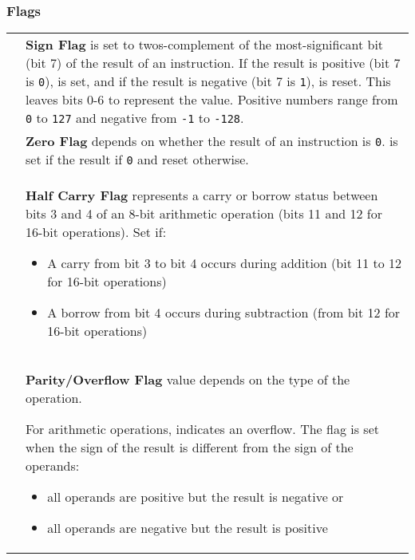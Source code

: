 \subsubsection{Flags}

\newcommand{\DetailsFlagTableList}[1]{
	\vspace*{-2ex}
	\setlist{leftmargin=1em,after=\vspace{-2ex}}
	\begin{itemize}
		\setlength\itemsep{-4pt}
		#1
	\end{itemize}
}

\newcommand{\DetailsFlagTableParagraph}{\vspace{1ex}}

{	
	\renewcommand{\arraystretch}{1.5}

	\begin{tabularx}{\linewidth}{cX}
		\FlagSF{} &
			\textbf{Sign Flag} is set to twos-complement of the most-significant bit (bit 7) of the result of an instruction. If the result is positive (bit 7 is {\tt 0}), \FlagSF{} is set, and if the result is negative (bit 7 is {\tt 1}), \FlagSF{} is reset. This leaves bits 0-6 to represent the value. Positive numbers range from {\tt 0} to {\tt 127} and negative from {\tt -1} to {\tt -128}.
			\\

		\FlagZF{} &
			\textbf{Zero Flag} depends on whether the result of an instruction is {\tt 0}. \FlagZF{} is set if the result if {\tt 0} and reset otherwise.
			\\

		\FlagHF{} &
			\textbf{Half Carry Flag} represents a carry or borrow status between bits 3 and 4 of an 8-bit arithmetic operation (bits 11 and 12 for 16-bit operations). Set if:
		
			\DetailsFlagTableList{
				\item A carry from bit 3 to bit 4 occurs during addition (bit 11 to 12 for 16-bit operations)
				\item A borrow from bit 4 occurs during subtraction (from bit 12 for 16-bit operations)
			}
			\\

		\FlagPV{} &
			\textbf{Parity/Overflow Flag} value depends on the type of the operation.
			
			\DetailsFlagTableParagraph
			For arithmetic operations, \FlagPV{} indicates an overflow. The flag is set when the sign of the result is different from the sign of the operands:
			
			\DetailsFlagTableList{
				\item all operands are positive but the result is negative or
				\item all operands are negative but the result is positive
			}
			

\end{tabularx}}
